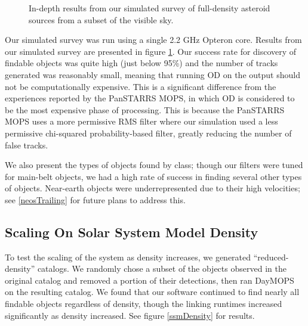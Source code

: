 \documentclass[12pt,preprint]{aastex}
\begin{document}
\begin{figure}[ht!]
\caption{In-depth results from our simulated survey of full-density asteroid sources from a subset of the visible sky.}
\label{bigSimResults}
\end{figure}

Our simulated survey was run using a single 2.2 GHz Opteron core.
Results from our simulated survey are presented in figure
\ref{bigSimResults}.  Our success rate for discovery of findable
objects was quite high (just below 95\%) and the number of tracks
generated was reasonably small, meaning that running OD on the output
should not be computationally expensive.  This is a significant
difference from the experiences reported by the PanSTARRS MOPS, in
which OD is considered to be the most expensive phase of processing.
This is because the PanSTARRS MOPS uses a more permissive RMS filter
where our simulation used a less permissive chi-squared
probability-based filter, greatly reducing the number of false tracks.

We also present the types of objects found by class; though our
filters were tuned for main-belt objects, we had a high rate of
success in finding several other types of objects.  Near-earth objects
were underrepresented due to their high velocities; see
\ref{neosTrailing} for future plans to address this.



\subsection{Scaling On Solar System Model Density}

To test the scaling of the system as density increases, we generated
``reduced-density'' catalogs.  We randomly chose a subset of the
objects observed in the original catalog and removed a portion of
their detections, then ran DayMOPS on the resulting catalog.  We found
that our software continued to find nearly all findable objects
regardless of density, though the linking runtimes increased
significantly as density increased. See figure \ref{ssmDensity} for
results.
\end{document}
